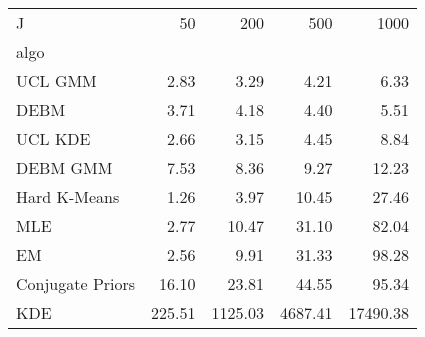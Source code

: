 \begin{tabular}{lrrrr}
\toprule
J & 50 & 200 & 500 & 1000 \\
algo &  &  &  &  \\
\midrule
UCL GMM & 2.83 & 3.29 & 4.21 & 6.33 \\
DEBM & 3.71 & 4.18 & 4.40 & 5.51 \\
UCL KDE & 2.66 & 3.15 & 4.45 & 8.84 \\
DEBM GMM & 7.53 & 8.36 & 9.27 & 12.23 \\
Hard K-Means & 1.26 & 3.97 & 10.45 & 27.46 \\
MLE & 2.77 & 10.47 & 31.10 & 82.04 \\
EM & 2.56 & 9.91 & 31.33 & 98.28 \\
Conjugate Priors & 16.10 & 23.81 & 44.55 & 95.34 \\
KDE & 225.51 & 1125.03 & 4687.41 & 17490.38 \\
\bottomrule
\end{tabular}
